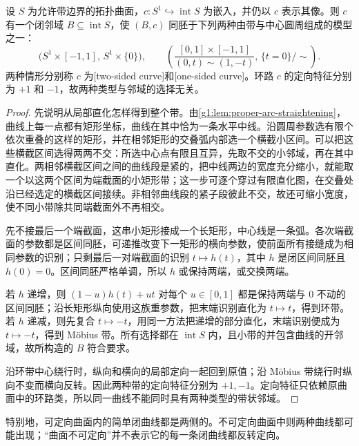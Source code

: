 \begin{lemma}\label{g1:lem:curve-band-neighborhood}
	设 \(S\) 为允许带边界的拓扑曲面，\(c:S^1\hookrightarrow\operatorname{int}S\) 为嵌入，并仍以 \(c\) 表示其像。则 \(c\) 有一个闭邻域 \(B\subseteq\operatorname{int}S\)，使 \((B,c)\) 同胚于下列两种由带与中心圆周组成的模型之一：
	\[
		\bigl(S^1\times[-1,1],\,S^1\times\{0\}\bigr),
		\qquad
		\left(\frac{[0,1]\times[-1,1]}{(0,t)\sim(1,-t)},\,\{t=0\}/\sim\right).
	\]
	两种情形分别称 \(c\) 为[two-sided curve]和[one-sided curve]。环路 \(c\) 的定向特征分别为 \(+1\) 和 \(-1\)，故两种类型与邻域的选择无关。
\end{lemma}
\begin{proof}
	先说明从局部直化怎样得到整个带。由\cref{g1:lem:proper-arc-straightening}，曲线上每一点都有矩形坐标，曲线在其中恰为一条水平中线。沿圆周参数选有限个依次重叠的这样的矩形，并在相邻矩形的交叠弧内部选一个横截小区间。可以把这些横截区间选得两两不交：所选中心点有限且互异，先取不交的小邻域，再在其中直化。两相邻横截区间之间的曲线段是紧的，把中线两边的宽度充分缩小，就能取一个以这两个区间为端截面的小矩形带；这一步可逐个穿过有限直化图，在交叠处沿已经选定的横截区间接续。非相邻曲线段的紧子段彼此不交，故还可缩小宽度，使不同小带除共同端截面外不再相交。

	先不接最后一个端截面，这串小矩形接成一个长矩形，中心线是一条弧。各次端截面的参数都是区间同胚，可递推改变下一矩形的横向参数，使前面所有接缝成为相同参数的识别；只剩最后一对端截面的识别 \(t\mapsto h(t)\)，其中 \(h\) 是闭区间同胚且 \(h(0)=0\)。区间同胚严格单调，所以 \(h\) 或保持两端，或交换两端。

	若 \(h\) 递增，则 \((1-u)h(t)+ut\) 对每个 \(u\in[0,1]\) 都是保持两端与 \(0\) 不动的区间同胚；沿长矩形纵向使用这族重参数，把末端识别直化为 \(t\mapsto t\)，得到环带。若 \(h\) 递减，则先复合 \(t\mapsto-t\)，用同一方法把递增的部分直化，末端识别便成为 \(t\mapsto-t\)，得到 Möbius 带。所有选择都在 \(\operatorname{int}S\) 内，且小带的并包含曲线的开邻域，故所构造的 \(B\) 符合要求。

	沿环带中心绕行时，纵向和横向的局部定向一起回到原值；沿 Möbius 带绕行时纵向不变而横向反转。因此两种带的定向特征分别为 \(+1,-1\)。定向特征只依赖原曲面中的环路类，所以同一曲线不能同时具有两种类型的带状邻域。
\end{proof}

特别地，可定向曲面内的简单闭曲线都是两侧的。不可定向曲面中则两种曲线都可能出现；“曲面不可定向”并不表示它的每一条闭曲线都反转定向。

